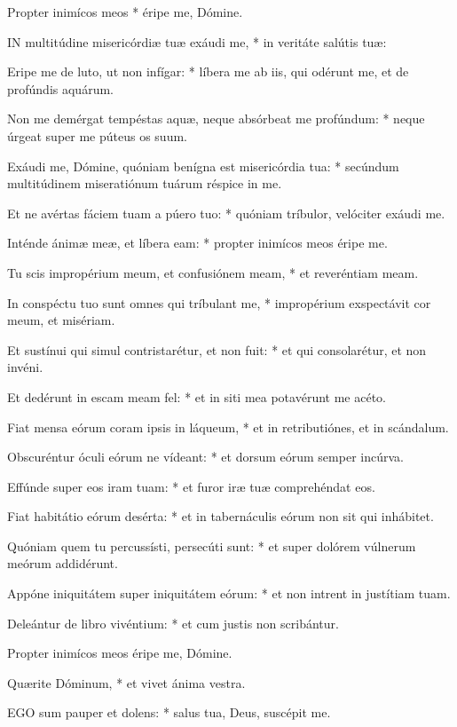  Propter inimícos meos * éripe me, Dómine.


\lettrine[lines=2]{I}{N} multitúdine misericórdiæ tuæ exáudi me, * in veritáte salútis tuæ:

Eripe me de luto, ut non infígar: * líbera me ab iis, qui odérunt me, et de profúndis aquárum.

Non me demérgat tempéstas aquæ, neque absórbeat me profúndum: * neque úrgeat super me púteus os suum.

Exáudi me, Dómine, quóniam benígna est misericórdia tua: * secúndum multitúdinem miseratiónum tuárum réspice in me.

Et ne avértas fáciem tuam a púero tuo: * quóniam tríbulor, velóciter exáudi me.

Inténde ánimæ meæ, et líbera eam: * propter inimícos meos éripe me.

Tu scis impropérium meum, et confusiónem meam, * et reveréntiam meam.

In conspéctu tuo sunt omnes qui tríbulant me, * impropérium exspectávit cor meum, et misériam.

Et sustínui qui simul contristarétur, et non fuit: * et qui consolarétur, et non invéni.

Et dedérunt in escam meam fel: * et in siti mea potavérunt me acéto.

Fiat mensa eórum coram ipsis in láqueum, * et in retributiónes, et in scándalum.

Obscuréntur óculi eórum ne vídeant: * et dorsum eórum semper incúrva.

Effúnde super eos iram tuam: * et furor iræ tuæ comprehéndat eos.

Fiat habitátio eórum desérta: * et in tabernáculis eórum non sit qui inhábitet.

Quóniam quem tu percussísti, persecúti sunt: * et super dolórem vúlnerum meórum addidérunt.

Appóne iniquitátem super iniquitátem eórum: * et non intrent in justítiam tuam.

Deleántur de libro vivéntium: * et cum justis non scribántur.

 Propter inimícos meos éripe me, Dómine.

 Quærite Dóminum, * et vivet ánima vestra.


\lettrine[lines=2]{E}{GO} sum pauper et dolens: * salus tua, Deus, suscépit me.

